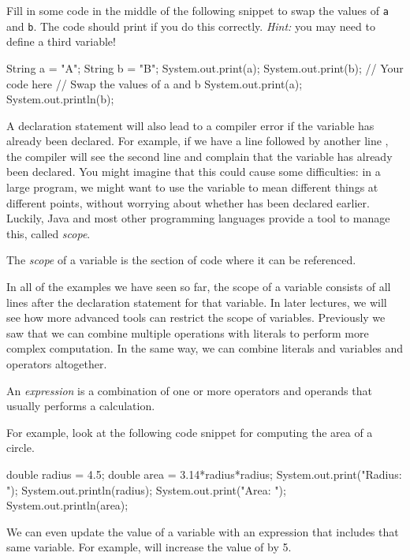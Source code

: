 \begin{exercise}	
  Fill in some code in the middle of the following snippet to swap the values of \texttt{a} and \texttt{b}. The code should print  if you do this correctly. \emph{Hint:} you may need to define a third variable!	
  \begin{code}	
    String a = "A";	
    String b = "B";	
    System.out.print(a);	
    System.out.print(b);	
    // Your code here	
    // Swap the values of a and b	
    System.out.print(a);	
    System.out.println(b);	
  \end{code}	
\end{exercise}	
A declaration statement will also lead to a compiler error if the variable has already been declared. For example, if we have a line  followed by another line , the compiler will see the second line and complain that the variable  has already been declared. You might imagine that this could cause some difficulties: in a large program, we might want to use the variable  to mean different things at different points, without worrying about whether  has been declared earlier. Luckily, Java and most other programming languages provide a tool to manage this, called \emph{scope}.	
\begin{definition}	
  The \emph{scope} of a variable is the section of code where it can be referenced.	
\end{definition}	
In all of the examples we have seen so far, the scope of a variable consists of all lines after the declaration statement for that variable. In later lectures, we will see how more advanced tools can restrict the scope of variables.	
Previously we saw that we can combine multiple operations with literals to perform more complex computation. In the same way, we can combine literals and variables and operators altogether.	
\begin{definition}	
An \emph{expression} is a combination of one or more operators and operands that usually performs a calculation.	
\end{definition}	
For example, look at the following code snippet for computing the area of a circle.	
\begin{code}	
  double radius = 4.5;	
  double area = 3.14*radius*radius;	
  System.out.print("Radius: ");	
  System.out.println(radius);	
  System.out.print("Area: ");	
  System.out.println(area);	
\end{code}	
We can even update the value of a variable with an expression that includes that same variable. For example,  will increase the value of  by 5.	
